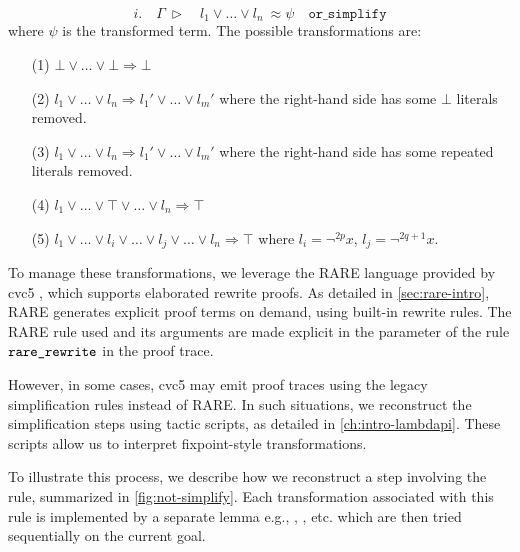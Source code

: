 \begin{equation}\label{eqn:or-simp}
i. \quad \Gamma~\triangleright \quad l_1 \lor \dots \lor l_n ~ \approx \psi \quad \texttt{or\_simplify}
\end{equation}
where $\psi$ is the transformed term. The possible transformations are:
\begin{enumerate}
\item[(1)] $\bot \lor \dots \lor \bot \Rightarrow \bot$
\item[(2)] $l_1 \lor \dots \lor l_n \Rightarrow l_1' \lor \dots \lor l_m'$ where the right-hand side has some $\bot$ literals removed.
\item[(3)]  $l_1 \lor \dots \lor l_n \Rightarrow l_1' \lor \dots \lor l_m'$ where the right-hand side has some repeated literals removed.
\item[(4)] $l_1 \lor \dots \lor \top \lor \dots \lor l_n \Rightarrow \top$
\item[(5)] $l_1 \lor \dots \lor l_i \lor \dots \lor l_j \lor \dots \lor  l_n \Rightarrow \top$ where $l_i = \neg^{2p} x$, $l_j = \neg^{2q+1} x$.
\end{enumerate}

To manage these transformations, we leverage the RARE language provided by cvc5 \cite{rare}, which supports elaborated rewrite proofs.
As detailed in \cref{sec:rare-intro}, RARE generates explicit proof terms on demand, using built-in rewrite rules.
The RARE rule used and its arguments are made explicit in the  parameter of the rule $\texttt{\upshape{rare\_rewrite}}$ in the proof trace.

However, in some cases, cvc5 may emit proof traces using the legacy simplification rules instead of RARE. In such situations, we reconstruct the simplification steps using tactic scripts, as detailed in \cref{ch:intro-lambdapi}.
These scripts allow us to interpret fixpoint-style transformations.

To illustrate this process, we describe how we reconstruct a step involving the  rule, summarized in \cref{fig:not-simplify}.
Each transformation associated with this rule is implemented by a separate lemma e.g., , , etc. which are then tried sequentially on the current goal.

